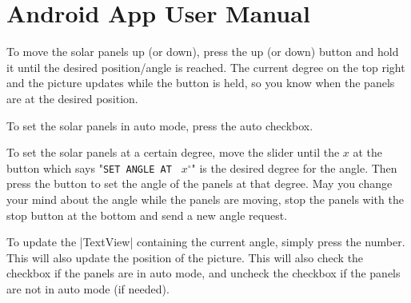 \section{Android App User Manual}\label{subsec:userManual}
To move the solar panels up (or down), press the up (or down) button and hold it until the desired position/angle is reached.
The current degree on the top right and the picture updates while the button is held, so you know when the panels are at the desired position.

To set the solar panels in auto mode, press the auto checkbox.


To set the solar panels at a certain degree, move the slider until the $x$ at the button which says "\verb|SET ANGLE AT | $x^{\circ}$" is the desired degree for the angle.
Then press the button to set the angle of the panels at that degree.
May you change your mind about the angle while the panels are moving, stop the panels with the stop button at the bottom and send a new angle request.

To update the |TextView| containing the current angle, simply press the number.
This will also update the position of the picture.
This will also check the checkbox if the panels are in auto mode, and uncheck the checkbox if the panels are not in auto mode (if needed).
